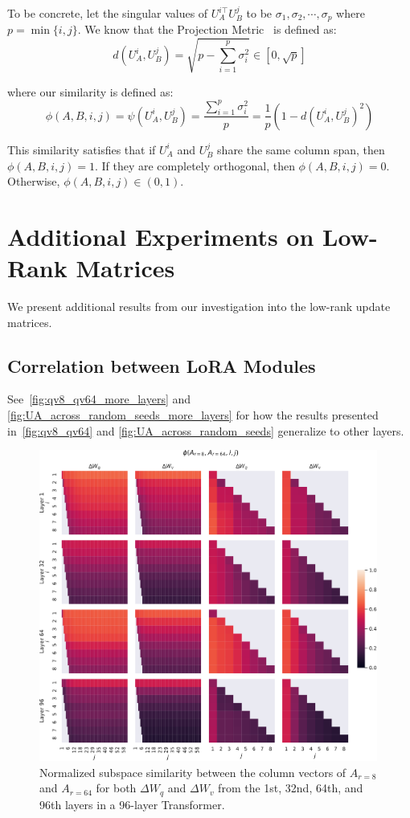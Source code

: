 \documentclass{article} %
\begin{document}
To be concrete, let the singular values of $ U_A^{i\top } U_B^j$ to be $\sigma_1, \sigma_2, \cdots, \sigma_{p}$ where $p = \min \{i, j \}$. We know that the Projection Metric~\cite{dist} is defined as:
$$d(U_A^i, U_B^j) = \sqrt{ p - \sum_{i = 1}^p \sigma_i^2} \in [0, \sqrt{p}]$$

where our similarity is defined as:
$$\phi(A, B, i, j) = \psi(U_A^i, U_B^j) = \frac{\sum_{i = 1}^p \sigma_i^2}{p}= \frac{1}{p} \left( 1 - d(U_A^i, U_B^j)^2 \right)$$

This similarity satisfies that if $U_A^i$ and $U_B^j$ share the same column span, then $\phi(A, B, i, j) = 1$.
If they are completely orthogonal, then $\phi(A, B, i, j) = 0$. Otherwise, $\phi(A, B, i, j) \in (0, 1)$.



\section{Additional Experiments on Low-Rank Matrices}
We present additional results from our investigation into the low-rank update matrices.
\subsection{Correlation between LoRA Modules}
\label{app:corr_lora}
See~\autoref{fig:qv8_qv64_more_layers} and \autoref{fig:UA_across_random_seeds_more_layers} for how the results presented in~\autoref{fig:qv8_qv64} and \autoref{fig:UA_across_random_seeds} generalize to other layers.
\begin{figure}[h]
  \centering
    \includegraphics[width=0.99\textwidth]{figures/qv8_qv64_more_layers.pdf}
    \caption{Normalized subspace similarity between the column vectors of $A_{r=8}$ and $A_{r=64}$ for both $\Delta W_q$ and $\Delta W_v$ from the 1st, 32nd, 64th, and 96th layers in a 96-layer Transformer.}
    \label{fig:qv8_qv64_more_layers}
\end{figure}
\end{document}
